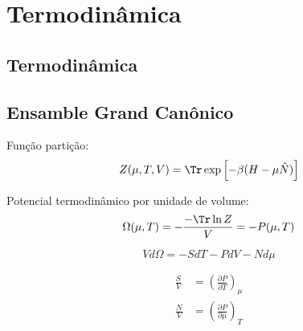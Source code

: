 \chapter{Termodinâmica}

%

\section{Termodinâmica}

\section{Ensamble Grand Canônico}

Função partição:
\begin{equation}
	Z(\mu, T, V) = \Tr \exp\left[-\beta(H-\mu\hat{N})\right]
\end{equation}

Potencial termodinâmico por unidade de volume:
\begin{equation}
	\Omega(\mu, T) = -\frac{-\Tr\ln Z}{V} = -P(\mu,T)
\end{equation}

\begin{equation}
	Vd\Omega = -S dT - PdV - Nd\mu
\end{equation}

\begin{align}
	\frac{S}{V} &= \left(\frac{\partial P}{\partial T}\right)_\mu \\
	\frac{N}{V} &= \left(\frac{\partial P}{\partial\mu}\right)_T
\end{align}

